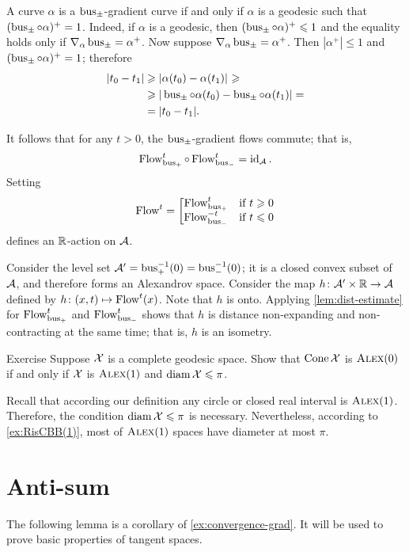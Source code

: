 A curve $\alpha$ is a $\operatorname{\rm bus}\nolimits_\pm$-gradient curve
if and only if $\alpha$ is a geodesic such that $(\operatorname{\rm bus}\nolimits_\pm\circ\alpha)^+=1$.
Indeed, if $\alpha$ is a geodesic, then $(\operatorname{\rm bus}\nolimits_\pm\circ\alpha)^+\leqslant 1$ and the equality holds only if $\nabla_\alpha\operatorname{\rm bus}\nolimits_\pm=\alpha^+$.
Now suppose $\nabla_\alpha\operatorname{\rm bus}\nolimits_\pm=\alpha^+$.
Then $|\alpha^+|\le 1$ and $(\operatorname{\rm bus}\nolimits_\pm\circ\alpha)^+=1$; therefore 
\begin{align*}
|t_0-t_1|&\geqslant |{\alpha(t_0)}-{\alpha(t_1)}|_{}^{{}}\geqslant
\\
&\geqslant|\operatorname{\rm bus}\nolimits_\pm\circ\alpha(t_0)-\operatorname{\rm bus}\nolimits_\pm\circ\alpha(t_1)|=
\\
&=|t_0-t_1|.
\end{align*}

It follows that for any $t>0$, the $\operatorname{\rm bus}\nolimits_\pm$-gradient flows commute;
that is, 
\[\mathop{\rm Flow}\nolimits_{\operatorname{\rm bus}\nolimits_+}^t\circ\mathop{\rm Flow}\nolimits_{\operatorname{\rm bus}\nolimits_-}^t=\operatorname{\rm id}\nolimits_{\mathcal{A}}.\]
Setting
\[\mathop{\rm Flow}\nolimits^t=\left[\begin{matrix}
\mathop{\rm Flow}\nolimits_{\operatorname{\rm bus}\nolimits_+}^t&\hbox{if}\ t\geqslant0\\
\mathop{\rm Flow}\nolimits_{\operatorname{\rm bus}\nolimits_-}^{-t}&\hbox{if}\ t\leqslant0
               \end{matrix}\right.\]
defines an $\mathbb{R}$-action on $\mathcal{A}$.

Consider the level set $\mathcal{A}'=\operatorname{\rm bus}\nolimits_+^{-1}(0)=\operatorname{\rm bus}\nolimits_-^{-1}(0)$;
it is a closed convex subset of $\mathcal{A}$, and therefore forms an Alexandrov space.
Consider the map $h\colon\mathcal{A}'\times \mathbb{R}\to \mathcal{A}$ defined by $h\colon(x,t)\mapsto \mathop{\rm Flow}\nolimits^t(x)$.
Note that $h$ is onto.
Applying \ref{lem:dist-estimate} for $\mathop{\rm Flow}\nolimits_{\operatorname{\rm bus}\nolimits_+}^t$ and $\mathop{\rm Flow}\nolimits_{\operatorname{\rm bus}\nolimits_-}^t$ shows that $h$ is distance non-expanding and non-contracting at the same time; that is, $h$ is an isometry.
\qeds

\begin{thm}{Exercise}\label{ex:cone-CBB}
Suppose $\mathcal{X}$ is a complete geodesic space.
Show that $\mathop{\rm Cone}\nolimits\mathcal{X}$ is $\textsc{Alex}(0)$ if and only if $\mathcal{X}$ is $\textsc{Alex}(1)$ and $\operatorname{\rm diam}\nolimits\mathcal{X}\leqslant \pi$.
\end{thm}

Recall that according our definition any circle or closed real interval is $\textsc{Alex}(1)$.
Therefore, the condition $\operatorname{\rm diam}\nolimits\mathcal{X}\leqslant \pi$ is necessary.
Nevertheless, according to \ref{ex:RisCBB(1)}, most of $\textsc{Alex}(1)$ spaces have diameter at most $\pi$.

\section{Anti-sum}

The following lemma is a corollary of \ref{ex:convergence-grad}.
It will be used to prove basic properties of tangent spaces.



